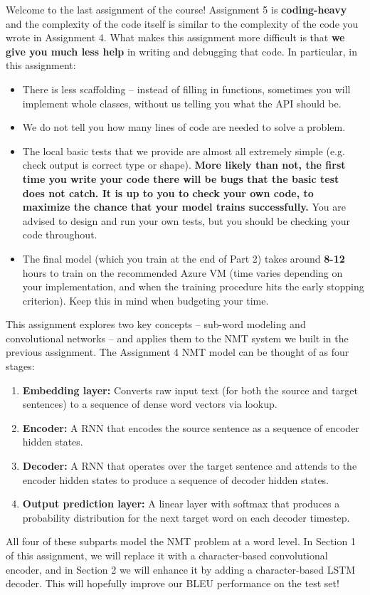 \begin{framed}
    \noindent
    Welcome to the last assignment of the course! Assignment 5 is \textbf{coding-heavy} and the complexity of the code itself is similar to the complexity of the code you wrote in Assignment 4.
    What makes this assignment more difficult is that \textbf{we give you much less help} in writing and debugging that code.
    In particular, in this assignment:
    \begin{itemize}
        \item There is less scaffolding -- instead of filling in functions, sometimes you will implement whole classes, without us telling you what the API should be.
        \item We do not tell you how many lines of code are needed to solve a problem.
        \item The local basic tests that we provide are almost all extremely simple (e.g. check output is correct type or shape). \textbf{More likely than not, the first time you write your code there will be bugs that the basic test does not catch. 
        It is up to you to check your own code, to maximize the chance that your model trains successfully.}
        You are advised to design and run your own tests, but you should be checking your code throughout.
        \item The final model (which you train at the end of Part 2) takes around \textbf{8-12} hours to train on the recommended Azure VM (time varies depending on your implementation, and when the training procedure hits the early stopping criterion). Keep this in mind when budgeting your time.
    \end{itemize}
\end{framed}  
    
This assignment explores two key concepts -- sub-word modeling and convolutional networks -- and applies them to the NMT system we built in the previous assignment. The Assignment 4 NMT model can be thought of as four stages: 
\begin{enumerate}
    \item \textbf{Embedding layer:} Converts raw input text (for both the source and target sentences) to a sequence of dense word vectors via lookup.
    \item \textbf{Encoder:} A RNN that encodes the source sentence as a sequence of encoder hidden states.
    \item \textbf{Decoder:} A RNN that operates over the target sentence and attends to the encoder hidden states to produce a sequence of decoder hidden states.
    \item \textbf{Output prediction layer:} A linear layer with softmax that produces a probability distribution for the next target word on each decoder timestep.
\end{enumerate}
All four of these subparts model the NMT problem at a word level.
In Section 1 of this assignment, we will replace it with a character-based convolutional encoder, and in Section 2 we will enhance it by adding a character-based LSTM decoder.
This will hopefully improve our BLEU performance on the test set!
